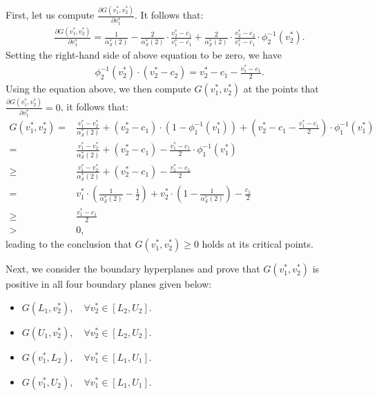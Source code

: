 First, let us compute $\frac{\partial G(v^{*}_{1},v^{*}_{2}) }{\partial v^{*}_{1}} $. It follows that:
        \begin{align*}
           \frac{\partial G(v^{*}_{1},v^{*}_{2}) }{\partial v^{*}_{1}}  =  \frac{1}{\alpha_{\mathcal{S}}^*(2)} - \frac{2}{\alpha_{\mathcal{S}}^*(2)}\cdot \frac{v^{*}_{2}-c_{1}}{v^{*}_{1}-c_{1}}  + \frac{2}{\alpha_{\mathcal{S}}^*(2)} \cdot \frac{v^{*}_{2}-c_{2}}{v^{*}_{1}-c_{1}} \cdot \phi_{2}^{-1}(v^{*}_{2}).
            \end{align*}
Setting the right-hand side of above equation to be zero, we have
\begin{align*}
 \phi_{2}^{-1}(v^{*}_{2})\cdot(v^{*}_{2}-c_2) = v^{*}_{2} - c_1 - \frac{v^{*}_{1}-c_1}{2}.
\end{align*}
Using the equation above, we then compute $G(v^{*}_{1},v^{*}_{2})$ at the points that $\frac{\partial G(v^{*}_{1},v^{*}_{2}) }{\partial v^{*}_{1}} = 0$, it follows that:
        \begin{align*}
            G(v^{*}_{1},v^{*}_{2}) 
            =& \frac{v^{*}_{1}-v^{*}_{2}}{\alpha_{\mathcal{S}}^*(2)} + (v^{*}_{2}-c_1)\cdot(1-\phi_1^{-1}(v^{*}_{1})) +  (v^{*}_{2} - c_1 - \frac{v^{*}_{1}-c_1}{2})\cdot\phi_1^{-1}(v^{*}_{1}) \\
             = &  \frac{v^{*}_{1}-v^{*}_{2}}{\alpha_{\mathcal{S}}^*(2)} + (v^{*}_{2} - c_1) - \frac{v^{*}_{1}-c_1}{2}\cdot \phi_{1}^{-1}(v^{*}_{1})  \\
             \ge & \frac{v^{*}_{1}-v^{*}_{2}}{\alpha_{\mathcal{S}}^*(2)} + (v^{*}_{2} - c_1) - \frac{v^{*}_{1}-c_1}{2}\\
            = & v^{*}_{1} \cdot (\frac{1}{\alpha_{\mathcal{S}}^*(2)}-\frac{1}{2}) + v^{*}_{2} \cdot (1-\frac{1}{\alpha_{\mathcal{S}}^*(2)}) - \frac{c_1}{2} \\
            \ge & \frac{v^{*}_{1}-c_1}{2} \\
            > & 0,
        \end{align*}
leading to the conclusion that  $G(v^{*}_{1}, v^{*}_{2}) \geq 0 $ holds at its critical points.
        
        Next, we consider the boundary hyperplanes and prove that $G(v^{*}_{1},v^{*}_{2})$ is positive in all four boundary planes given below:
        \begin{itemize}
            \item $ G(L_1,v^{*}_{2}), \quad \forall v^{*}_{2} \in [L_{2},U_{2}]$.
            \item $G(U_1,v^{*}_{2}), \quad \forall v^{*}_{2} \in [L_{2},U_{2}]$.
            \item $G(v^{*}_{1},L_2), \quad \forall v^*_{1} \in [L_{1},U_{1}]$.
            \item $G(v^{*}_{1},U_2), \quad \forall v^*_{1} \in [L_{1},U_{1}]$.   \end{itemize}

